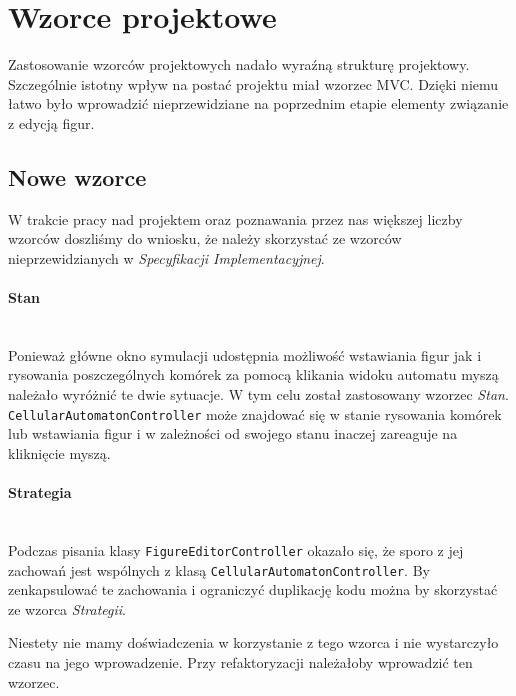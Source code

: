 \documentclass{mwart}
\newcommand{\paragraphnl}[1]{\paragraph{#1} \mbox{} \\} %
\begin{document}
\section{Wzorce projektowe}
Zastosowanie wzorców projektowych nadało wyraźną strukturę projektowy. Szczególnie istotny wpływ na postać projektu miał wzorzec MVC. Dzięki niemu łatwo było wprowadzić nieprzewidziane na poprzednim etapie elementy związanie z edycją figur.

\subsection{Nowe wzorce}
W trakcie pracy nad projektem oraz poznawania przez nas większej liczby wzorców doszliśmy do wniosku, że należy skorzystać ze wzorców nieprzewidzianych w \textit{Specyfikacji Implementacyjnej}.

\paragraph{Stan} \mbox{} \\
Ponieważ główne okno symulacji udostępnia możliwość wstawiania figur jak i rysowania poszczególnych komórek za pomocą klikania widoku automatu myszą należało wyróżnić te dwie sytuacje. 
W tym celu został zastosowany wzorzec \textit{Stan}. \texttt{CellularAutomatonController} może znajdować się w stanie rysowania komórek lub wstawiania figur i w zależności od swojego stanu inaczej zareaguje na kliknięcie myszą.

\paragraphnl{Strategia}
Podczas pisania klasy \texttt{FigureEditorController} okazało się, że sporo z jej zachowań jest wspólnych z klasą \texttt{CellularAutomatonController}. By zenkapsulować te zachowania i ograniczyć duplikację kodu można by skorzystać ze wzorca \textit{Strategii}.

Niestety nie mamy doświadczenia w korzystanie z tego wzorca i nie wystarczyło czasu na jego wprowadzenie. Przy refaktoryzacji należałoby wprowadzić ten wzorzec.
\end{document}
